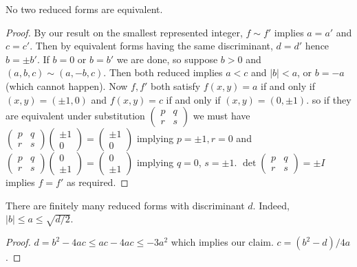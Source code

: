 \documentclass[a4paper, 10pt, twocolumn]{amsart}
\begin{document}
\begin{theorem}
    No two reduced forms are equivalent.
\end{theorem}

\begin{proof}
    By our result on the smallest represented integer, $f \sim f'$ implies $a = a'$ and $c = c'$. Then by equivalent forms having the same discriminant, $d = d'$ hence $b = \pm b'$. If $b = 0$ or $b = b'$ we are done, so suppose $b > 0$ and $(a, b, c) \sim (a, -b, c)$. Then both reduced implies $a < c$ and $|b| < a$, or $b = -a$ (which cannot happen). Now $f, f'$ both satisfy $f(x, y) = a$ if and only if $(x, y) = (\pm 1, 0)$ and $f(x, y) = c$ if and only if $(x, y) = (0, \pm 1)$. so if they are equivalent under substitution $\begin{pmatrix}
        p & q \\ r & s
    \end{pmatrix}$ we must have $\begin{pmatrix}
        p & q \\ r & s
    \end{pmatrix}\begin{pmatrix}
        \pm 1 \\ 0
    \end{pmatrix} = \begin{pmatrix}
        \pm 1 \\ 0
    \end{pmatrix}$
    implying $p = \pm 1, r = 0$ and $\begin{pmatrix}
        p & q \\ r & s
    \end{pmatrix}\begin{pmatrix}
       0 \\ \pm 1
    \end{pmatrix} = \begin{pmatrix}
        0 \\\pm 1
    \end{pmatrix}$ implying $q = 0$, $s = \pm 1$. $\det \begin{pmatrix}
        p & q \\ r & s
    \end{pmatrix} = \pm I$ implies $f = f'$ as required.
\end{proof}

\begin{theorem}
    There are finitely many reduced forms with discriminant $d$. Indeed, $|b| \leq a \leq \sqrt{d/2}$.
\end{theorem}
\begin{proof}
    $d = b^2 - 4ac \leq ac - 4ac \leq -3a^2$ which implies our claim. $c = (b^2 - d)/4a$.
\end{proof}
\end{document}

